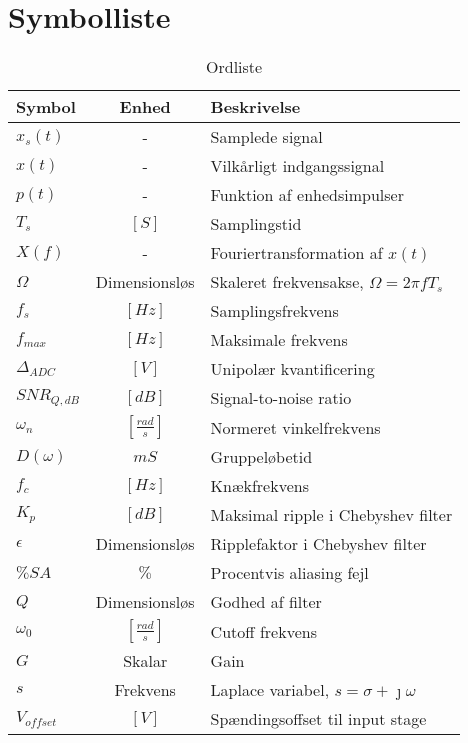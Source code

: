 \chapter{Symbolliste} \label{bilag:symbolliste}
\begin{table}[h!]
	\caption{Ordliste}
	\label{tab:ordliste}
	\begin{threeparttable}
		\begin{tabular}{l c p{}}
			\toprule
			\textbf{Symbol}      &
			\textbf{Enhed} & \textbf{Beskrivelse} \\
			\midrule
			$x_s(t)$ &	- & Samplede signal \\
			$x(t)$   & 	- &  Vilkårligt indgangssignal \\
			$p(t)$	 & - & 	Funktion af enhedsimpulser \\
			$T_s$ 	 & $\left[\si{S}\right]$ & Samplingstid \\ 
			$X(f)$ &  -	 &	Fouriertransformation af $x(t)$ \\
			$\Omega$ & Dimensionsløs & Skaleret frekvensakse, $\Omega = 2 \pi f T_s$ \\
			$f_s$ &	$\left[\si{Hz}\right]$ & Samplingsfrekvens \\
			$f_{max}$ & $\left[\si{Hz}\right]$ & Maksimale frekvens \\
			$\Delta_{ADC}$ & $[\si{V}]$ & Unipolær kvantificering \\
			$SNR_{Q, dB}$ & $[\si{dB}]$ & Signal-to-noise ratio \\
			$\omega_n$ & $\left[\si{\frac{rad}{s}}\right]$ &  Normeret vinkelfrekvens \\
			$D(\omega)$ & $\si{mS}$ &  Gruppeløbetid \\
			$f_c$ & $\left[\si{Hz}\right]$ & Knækfrekvens \\
			$K_p$ & $\left[\si{dB}\right]$ & Maksimal ripple i Chebyshev filter \\
			$\epsilon$ & Dimensionsløs & Ripplefaktor i Chebyshev filter \\
			$\%SA$ & $\%$ & Procentvis aliasing fejl\\
			$Q$ & Dimensionsløs & Godhed af filter \\
			$\omega_0$ & $\left[\si{\frac{rad}{s}}\right]$ & Cutoff frekvens\\
			$G$ & Skalar & Gain \\
			$s$ & Frekvens & Laplace variabel, $s = \sigma + \jmath \omega$ \\
			$V_{offset}$ & $\left[\si{V}\right]$ & Spændingsoffset til input stage \\

\end{tabular}
\end{threeparttable}
\end{table}
